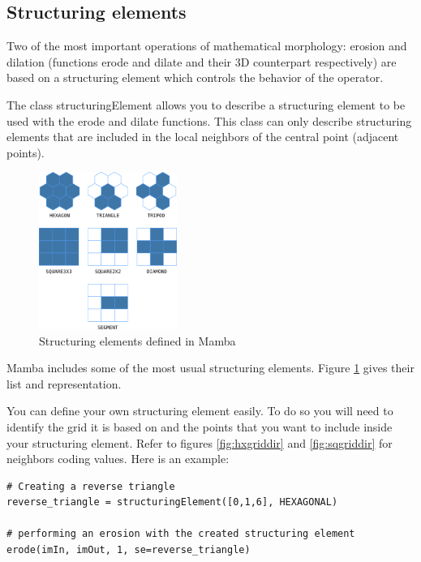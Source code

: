 \documentclass[a4paper,10pt,oneside]{article}
\begin{document}
\subsection{Structuring elements}

Two of the most important operations of mathematical morphology: erosion and
dilation (functions erode and dilate and their 3D counterpart respectively)
are based on a structuring element which controls the behavior of the operator.

The class structuringElement allows you to describe a structuring element to
be used with the erode and dilate functions. This class can only describe
structuring elements that are included in the local 
neighbors of the central point (adjacent points).

\begin{figure}
\centering
\includegraphics[width=0.4\textwidth]{figures/se.pdf}
\caption{Structuring elements defined in Mamba}
\label{fig:se}
\end{figure}

Mamba includes some of the most usual structuring elements. Figure
\ref{fig:se} gives their list and representation.

You can define your own structuring element easily. To do so you will need to
identify the grid it is based on and the points that you want to include 
inside your structuring element. Refer to figures \ref{fig:hxgriddir} and 
\ref{fig:sqgriddir} for neighbors coding values. Here is an example:

\lstset{language=Python}
\begin{lstlisting}
# Creating a reverse triangle
reverse_triangle = structuringElement([0,1,6], HEXAGONAL)

# performing an erosion with the created structuring element
erode(imIn, imOut, 1, se=reverse_triangle)
\end{lstlisting}

\end{document}
